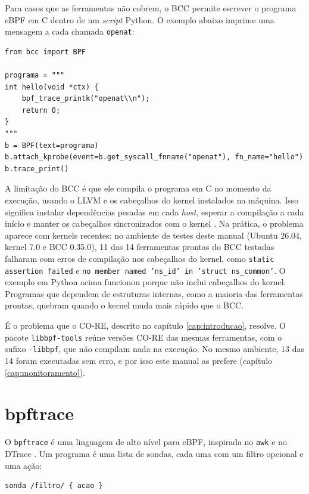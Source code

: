 Para casos que as ferramentas não cobrem, o BCC permite escrever o programa eBPF em C dentro de um \textit{script} Python. O exemplo abaixo imprime uma mensagem a cada chamada \texttt{openat}:

\begin{lstlisting}
from bcc import BPF

programa = """
int hello(void *ctx) {
    bpf_trace_printk("openat\\n");
    return 0;
}
"""
b = BPF(text=programa)
b.attach_kprobe(event=b.get_syscall_fnname("openat"), fn_name="hello")
b.trace_print()
\end{lstlisting}

A limitação do BCC é que ele compila o programa em C no momento da execução, usando o LLVM e os cabeçalhos do kernel instalados na máquina. Isso significa instalar dependências pesadas em cada \textit{host}, esperar a compilação a cada início e manter os cabeçalhos sincronizados com o kernel \cite{nakryiko2020}. Na prática, o problema aparece com kernels recentes: no ambiente de testes deste manual (Ubuntu 26.04, kernel 7.0 e BCC 0.35.0), 11 das 14 ferramentas prontas do BCC testadas falharam com erros de compilação nos cabeçalhos do kernel, como \texttt{static assertion failed} e \texttt{no member named 'ns\_id' in 'struct ns\_common'}. O exemplo em Python acima funcionou porque não inclui cabeçalhos do kernel. Programas que dependem de estruturas internas, como a maioria das ferramentas prontas, quebram quando o kernel muda mais rápido que o BCC.

É o problema que o CO-RE, descrito no capítulo \ref{cap:introducao}, resolve. O pacote \texttt{libbpf-tools} reúne versões CO-RE das mesmas ferramentas, com o sufixo \texttt{-libbpf}, que não compilam nada na execução. No mesmo ambiente, 13 das 14 foram executadas sem erro, e por isso este manual as prefere (capítulo \ref{cap:monitoramento}).

\section{bpftrace}

O \texttt{bpftrace} é uma linguagem de alto nível para eBPF, inspirada no \texttt{awk} e no DTrace \cite{bpftrace}. Um programa é uma lista de sondas, cada uma com um filtro opcional e uma ação:

\begin{lstlisting}
sonda /filtro/ { acao }
\end{lstlisting}

